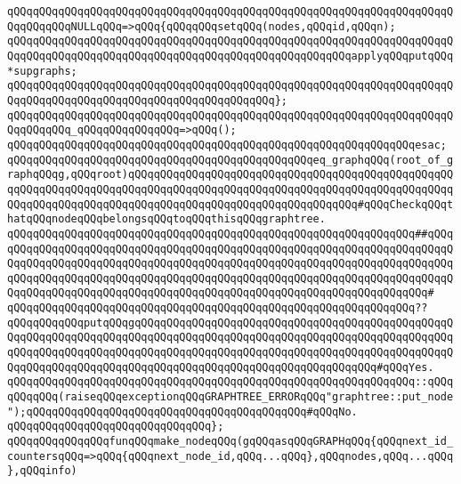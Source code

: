 \verb|qQQqqQQqqQQqqQQqqQQqqQQqqQQqqQQqqQQqqQQqqQQqqQQqqQQqqQQqqQQqqQQqqQQqqQQqqQQqqQQqNULLqQQq=>qQQq{qQQqqQQqsetqQQq(nodes,qQQqid,qQQqn);|\newline
\verb|qQQqqQQqqQQqqQQqqQQqqQQqqQQqqQQqqQQqqQQqqQQqqQQqqQQqqQQqqQQqqQQqqQQqqQQqqQQqqQQqqQQqqQQqqQQqqQQqqQQqqQQqqQQqqQQqqQQqqQQqqQQqapplyqQQqputqQQq*supgraphs;|\newline
\verb|qQQqqQQqqQQqqQQqqQQqqQQqqQQqqQQqqQQqqQQqqQQqqQQqqQQqqQQqqQQqqQQqqQQqqQQqqQQqqQQqqQQqqQQqqQQqqQQqqQQqqQQqqQQqqQQq};|\newline
\verb|qQQqqQQqqQQqqQQqqQQqqQQqqQQqqQQqqQQqqQQqqQQqqQQqqQQqqQQqqQQqqQQqqQQqqQQqqQQqqQQq_qQQqqQQqqQQqqQQq=>qQQq();|\newline
\verb|qQQqqQQqqQQqqQQqqQQqqQQqqQQqqQQqqQQqqQQqqQQqqQQqqQQqqQQqqQQqqQQqesac;|\newline
\newline
\verb|qQQqqQQqqQQqqQQqqQQqqQQqqQQqqQQqqQQqqQQqqQQqqQQqeq_graphqQQq(root_of_graphqQQqg,qQQqroot)qQQqqQQqqQQqqQQqqQQqqQQqqQQqqQQqqQQqqQQqqQQqqQQqqQQqqQQqqQQqqQQqqQQqqQQqqQQqqQQqqQQqqQQqqQQqqQQqqQQqqQQqqQQqqQQqqQQqqQQqqQQqqQQqqQQqqQQqqQQqqQQqqQQqqQQqqQQqqQQqqQQqqQQqqQQqqQQq#qQQqCheckqQQqthatqQQqnodeqQQqbelongsqQQqtoqQQqthisqQQqgraphtree.|\newline
\verb|qQQqqQQqqQQqqQQqqQQqqQQqqQQqqQQqqQQqqQQqqQQqqQQqqQQqqQQqqQQqqQQq##qQQqqQQqqQQqqQQqqQQqqQQqqQQqqQQqqQQqqQQqqQQqqQQqqQQqqQQqqQQqqQQqqQQqqQQqqQQqqQQqqQQqqQQqqQQqqQQqqQQqqQQqqQQqqQQqqQQqqQQqqQQqqQQqqQQqqQQqqQQqqQQqqQQqqQQqqQQqqQQqqQQqqQQqqQQqqQQqqQQqqQQqqQQqqQQqqQQqqQQqqQQqqQQqqQQqqQQqqQQqqQQqqQQqqQQqqQQqqQQqqQQqqQQqqQQqqQQqqQQqqQQqqQQqqQQqqQQqqQQq#|\newline
\verb|qQQqqQQqqQQqqQQqqQQqqQQqqQQqqQQqqQQqqQQqqQQqqQQqqQQqqQQqqQQqqQQq??qQQqqQQqqQQqputqQQqgqQQqqQQqqQQqqQQqqQQqqQQqqQQqqQQqqQQqqQQqqQQqqQQqqQQqqQQqqQQqqQQqqQQqqQQqqQQqqQQqqQQqqQQqqQQqqQQqqQQqqQQqqQQqqQQqqQQqqQQqqQQqqQQqqQQqqQQqqQQqqQQqqQQqqQQqqQQqqQQqqQQqqQQqqQQqqQQqqQQqqQQqqQQqqQQqqQQqqQQqqQQqqQQqqQQqqQQqqQQqqQQqqQQqqQQqqQQqqQQqqQQqqQQq#qQQqYes.|\newline
\verb|qQQqqQQqqQQqqQQqqQQqqQQqqQQqqQQqqQQqqQQqqQQqqQQqqQQqqQQqqQQqqQQq::qQQqqQQqqQQq(raiseqQQqexceptionqQQqGRAPHTREE_ERRORqQQq"graphtree::put_node");qQQqqQQqqQQqqQQqqQQqqQQqqQQqqQQqqQQqqQQqqQQq#qQQqNo.|\newline
\verb|qQQqqQQqqQQqqQQqqQQqqQQqqQQqqQQq};|\newline
\newline
\newline
\verb|qQQqqQQqqQQqqQQqfunqQQqmake_nodeqQQq(gqQQqasqQQqGRAPHqQQq{qQQqnext_id_countersqQQq=>qQQq{qQQqnext_node_id,qQQq...qQQq},qQQqnodes,qQQq...qQQq},qQQqinfo)|\newline
